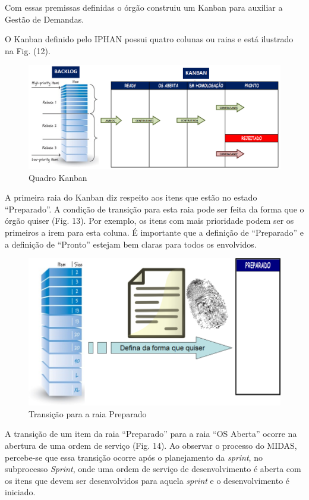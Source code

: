 Com essas premissas definidas o órgão construiu um Kanban para auxiliar a Gestão de Demandas. 

O Kanban definido pelo IPHAN possui quatro colunas ou raias e está ilustrado na Fig. (12).

\begin{figure}[H]
		\centering
		\label{fig05}
			\includegraphics[scale=0.5]{figuras/kanbanIPHAN1.png}
		\caption{Quadro Kanban  \cite{parente}}
\end{figure}

A primeira raia do Kanban diz respeito aos itens que estão no estado “Preparado”. A condição de transição para esta raia pode ser feita da forma que o órgão quiser (Fig. 13). Por exemplo, os itens com mais prioridade podem ser os primeiros a irem para esta coluna. É importante que a definição de “Preparado” e a definição de “Pronto” estejam bem claras para todos os envolvidos.

\begin{figure}[H]
		\centering
		\label{fig06}
			\includegraphics[scale=0.5]{figuras/kanbanIPHAN2.png}
		\caption{Transição para a raia Preparado \cite{parente}}
\end{figure}

A transição de um item da raia “Preparado” para a raia “OS Aberta” ocorre na abertura de uma ordem de serviço (Fig. 14). Ao observar o processo do MIDAS, percebe-se que essa transição ocorre após o planejamento da \textit{sprint}, no subprocesso \textit{Sprint}, onde uma ordem de serviço de desenvolvimento é aberta  com os itens que devem ser desenvolvidos para aquela \textit{sprint} e o desenvolvimento é iniciado. 

